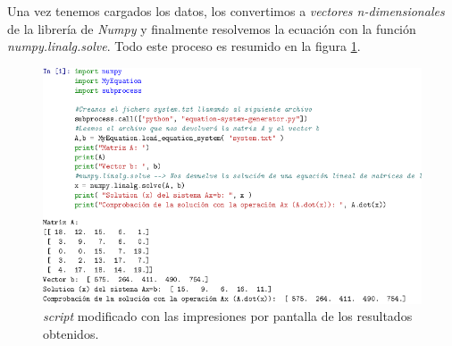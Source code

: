 \documentclass[12pt,twoside]{article}
\begin{document}
Una vez tenemos cargados los datos, los convertimos a \textit{vectores n-dimensionales} de la librería de \textit{Numpy} y finalmente resolvemos la ecuación con la función \textit{numpy.linalg.solve}.
Todo este proceso es resumido en la figura \ref{fig:fig6}.

\begin{figure}[hbt]
\begin{center}
	\includegraphics[width=1\textwidth]{task2.png}

	\caption{\textit{script} modificado con las impresiones por pantalla de los resultados obtenidos.}
	\label{fig:fig6}
\end{center}
\end{figure}


\end{document}
